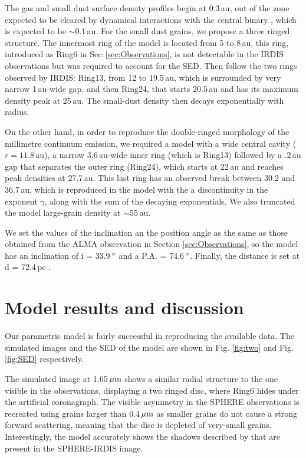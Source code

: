 \documentclass[letters,usenatbib,times]{mnras}
\begin{document}
The gas and small dust surface density profiles  begin at 0.3\,au, out of the zone expected to be cleared by dynamical interactions with the central binary \citep{Art_Lu}, which is expected to be $\sim$0.1\,au. For the small dust grains, we propose a three ringed structure. The innermost ring of the model is located from 5 to 8\,au, this ring, introduced as Ring6 in Sec.\,\ref{sec:Observations}, is not detectable in the IRDIS  observations but was required to account for the  SED. Then follow the two  rings observed by IRDIS:  Ring13, from 12 to 19.5\,au, which is surrounded by very narrow  1\,au-wide gap, and then Ring24, that starts  20.5\,au and has its maximum density peak at 25\,au. The small-dust density  then decays exponentially with  radius.


On the other hand, in order to reproduce the double-ringed  morphology of the millimetre continuum emission,  we required a model with   a wide central cavity ($r = 11.8$\,au), a narrow 3.6\,au-wide inner ring (which is Ring13) followed by a .2\,au gap  that separates the  outer ring (Ring24), which starts at  22\,au and reaches peak  densities  at 27.7\,au. This last ring has an observed break between 30.2 and 36.7\,au, which is reproduced in the model with the a discontinuity in the exponent $\gamma$, along with the sum of the decaying exponentials. We also truncated  the model large-grain density at  $\sim$55\,au. 


We set the values of the inclination an the position angle as the same as those obtained from the ALMA observation in Section \ref{sec:Observations}, so the model has an inclination of i = 33.9\,$\hbox{$^\circ$}$ and a P.A. = 74.6\,$\hbox{$^\circ$}$. Finally, the distance is set at d = 72.4\,pc \citep{Gaia}.

\section{Model results and discussion} \label{sec:results}

Our parametric model is fairly successful in reproducing the available data. The simulated images and the SED of the model are shown in Fig. \ref{fig:two} and Fig. \ref{fig:SED} respectively.

The simulated image at 1.65\,$\hbox{$\mu$m}$ shows a similar radial structure to the one visible in the observations, displaying a two ringed disc, where Ring6 hides under the artificial coronagraph. The visible asymmetry in the SPHERE observations is recreated using grains larger than 0.4\,$\hbox{$\mu$m}$ as smaller grains do not cause a strong forward scattering, meaning that the disc is depleted of very-small grains. Interestingly, the model accurately shows the shadows described by \citet{dOrazi} that are present in the SPHERE-IRDIS image.
\end{document}
